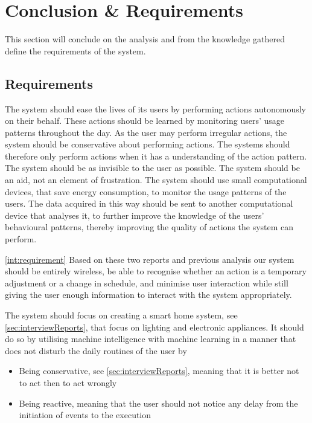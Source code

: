 \section{Conclusion \& Requirements}\label{sec:requirements}
This section will conclude on the analysis and from the knowledge gathered define the requirements of the system.

\subsection{Requirements}
The system should ease the lives of its users by performing actions autonomously
on their behalf. These actions should be learned by monitoring users' usage
patterns throughout the day. As the user may perform irregular actions, the
system should be conservative about performing actions. The systems should
therefore only perform actions when it has a understanding of the action
pattern. The system should be as invisible to the user as possible. The system
should be an aid, not an element of frustration. The system should use small
computational devices, that save energy consumption, to monitor the usage
patterns of the users. The data acquired in this way should be sent to another
computational device that analyses it, to further improve the knowledge of the
users' behavioural patterns, thereby improving the quality of actions the system can perform.

\cref{int:requirement} Based on these two reports and previous analysis our system should be entirely wireless, be able to recognise whether an action is a temporary adjustment or a change in schedule, and minimise user interaction while still giving the user enough information to interact with the system appropriately.

The system should focus on creating a smart home system, see \cref{sec:interviewReports}, that focus on lighting and electronic appliances. It should do so by utilising machine intelligence with machine learning in a manner that does not disturb the daily routines of the user by
\begin{itemize}
  \item Being conservative, see \cref{sec:interviewReports}, meaning that it is better not to act then to act wrongly
  \item Being reactive, meaning that the user should not notice any delay from the initiation of events to the execution
\end{itemize}

